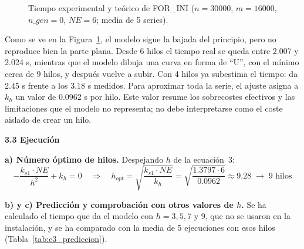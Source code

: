 \documentclass[12pt]{article}
\begin{document}
\begin{enumerate}
\begin{figure}[htbp]
\centering
{}
\caption{Tiempo experimental y teórico de FOR\_INI ($n = 30000$, $m = 16000$, $n\_gen = 0$, $NE = 6$; media de 5 series).}
\label{fig:c3_ajuste}
\end{figure}

Como se ve en la Figura~\ref{fig:c3_ajuste}, el modelo sigue la bajada del principio, pero no reproduce bien la parte plana. Desde 6 hilos el tiempo real se queda entre 2.007 y 2.024 s, mientras que el modelo dibuja una curva en forma de ``U'', con el mínimo cerca de 9 hilos, y después vuelve a subir. Con 4 hilos ya subestima el tiempo: da 2.45 s frente a los 3.18 s medidos. Para aproximar toda la serie, el ajuste asigna a $k_h$ un valor de 0.0962 s por hilo. Este valor resume los sobrecostes efectivos y las limitaciones que el modelo no representa; no debe interpretarse como el coste aislado de crear un hilo.

\medskip
\noindent\textbf{3.3 Ejecución}\par
\smallskip

\textbf{a) Número óptimo de hilos.} Despejando $h$ de la ecuación~3:
\[
-\frac{k_{s1} \cdot NE}{h^2} + k_h = 0 \quad\Rightarrow\quad h_{opt} = \sqrt{\frac{k_{s1} \cdot NE}{k_h}} = \sqrt{\frac{1.3797 \cdot 6}{0.0962}} \approx 9.28 \;\rightarrow\; 9 \text{ hilos}
\]

\textbf{b) y c) Predicción y comprobación con otros valores de $h$.} Se ha calculado el tiempo que da el modelo con $h = 3, 5, 7$ y 9, que no se usaron en la instalación, y se ha comparado con la media de 5 ejecuciones con esos hilos (Tabla~\ref{tab:c3_prediccion}).


\end{enumerate}
\end{document}
